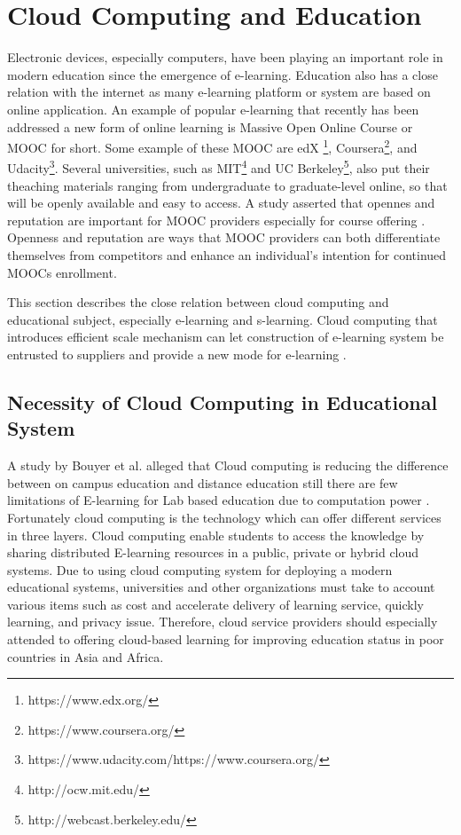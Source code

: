 \documentclass[journal]{vgtc}                %
\begin{document}
\section{Cloud Computing and Education}
Electronic devices, especially computers, have been playing an important role in modern education since the emergence of e-learning. Education also has a close relation with the internet as many e-learning platform or system are based on online application. An example of popular e-learning that recently has been addressed a new form of online learning is Massive Open Online Course or MOOC for short\cite{Margaryan2014}. Some example of these MOOC are edX \footnote{https://www.edx.org/}, Coursera\footnote{https://www.coursera.org/}, and Udacity\footnote{https://www.udacity.com/https://www.coursera.org/}. Several universities, such as MIT\footnote{http://ocw.mit.edu/} and UC Berkeley\footnote{http://webcast.berkeley.edu/}, also put their theaching materials ranging from undergraduate to graduate-level online, so that will be openly available and easy to access. A study asserted that opennes and reputation are important for MOOC providers especially for course offering \cite{Alraimi2014}. Openness and reputation are ways that MOOC providers can both differentiate themselves from competitors and enhance an individual's intention for continued MOOCs enrollment.

This section describes the close relation between cloud computing and educational subject, especially e-learning and s-learning. Cloud computing that introduces efficient scale mechanism can let construction of e-learning system be entrusted to suppliers and provide a new mode for e-learning \cite{Laisheng2011}.

  \subsection{Necessity of Cloud Computing in Educational System}
  A study by Bouyer et al. alleged that Cloud computing is reducing the difference between on campus education and distance education still there are few limitations of E-learning for Lab based education due to computation power \cite{Bouyer2014}. Fortunately cloud computing is the technology which can offer different services in three layers. Cloud computing enable students to access the knowledge by sharing distributed E-learning resources in a public, private or hybrid cloud systems. Due to using cloud computing system for deploying a modern educational systems, universities and other organizations must take to account various items such as cost and accelerate delivery of learning service, quickly learning, and privacy issue. Therefore, cloud service providers should especially attended to offering cloud-based learning for improving education status in poor countries in Asia and Africa.
\end{document}
